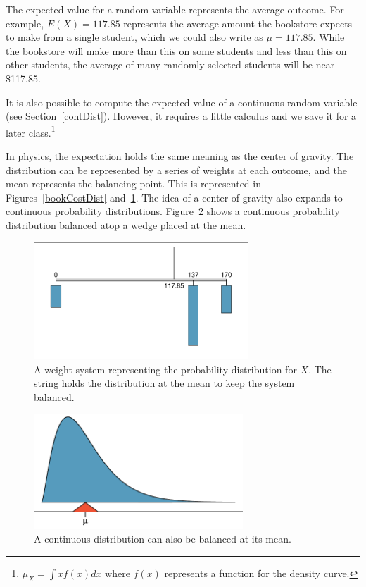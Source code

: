 The expected value for a random variable represents the average outcome. For example, $E(X)=117.85$ represents the average amount the bookstore expects to make from a single student, which we could also write as $\mu=117.85$. While the bookstore will make more than this on some students and less than this on other students, the average of many randomly selected students will be near \$117.85.

It is also possible to compute the expected value of a continuous random variable (see Section~\ref{contDist}). However, it requires a little calculus and we save it for a later class.\footnote{$\mu_{\scriptscriptstyle{X}} = \int xf(x)dx$ where $f(x)$ represents a function for the density curve.}

In physics, the expectation holds the same meaning as the center of gravity. The distribution can be represented by a series of weights at each outcome, and the mean represents the balancing point. This is represented in Figures~\ref{bookCostDist} and~\ref{bookWts}. The idea of a center of gravity also expands to continuous probability distributions. Figure~\ref{contBalance} shows a continuous probability distribution balanced atop a wedge placed at the mean.

\begin{figure}[h]
\centering
\includegraphics[width=0.72\textwidth]{ch_probability/figures/bookWts/bookWts}
\caption{A weight system representing the probability distribution for $X$. The string holds the distribution at the mean to keep the system balanced.}
\label{bookWts}
\end{figure}

\begin{figure}[h]
\centering
\includegraphics[width=0.7\textwidth]{ch_probability/figures/contBalance/contBalance}
\caption{A continuous distribution can also be balanced at its mean.}
\label{contBalance}
\end{figure}

